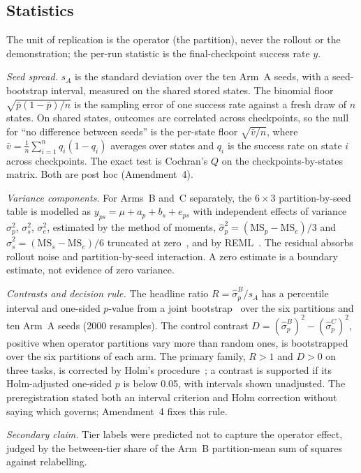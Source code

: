 \IfFileExists{IEEEtran.cls}{\documentclass[journal]{IEEEtran}}{\documentclass[10pt,twocolumn]{article}}
\newcommand{\sdp}{\hat\sigma_p}
\begin{document}
\subsection{Statistics}
\label{sec:stats}
The unit of replication is the operator (the partition), never the rollout or the demonstration; the per-run statistic is the final-checkpoint success rate $y$.

\emph{Seed spread.} $s_A$ is the standard deviation over the ten Arm~A seeds, with a seed-bootstrap interval, measured on the shared stored states. The binomial floor $\sqrt{\bar p(1-\bar p)/n}$ is the sampling error of one success rate against a fresh draw of $n$ states. On shared states, outcomes are correlated across checkpoints, so the null for ``no difference between seeds'' is the per-state floor $\sqrt{\bar v/n}$, where $\bar v=\frac{1}{n}\sum_{i=1}^{n} q_i(1-q_i)$ averages over states and $q_i$ is the success rate on state $i$ across checkpoints. The exact test is Cochran's $Q$ on the checkpoints-by-states matrix. Both are post hoc (Amendment~4).

\emph{Variance components.} For Arms~B and~C separately, the $6\times 3$ partition-by-seed table is modelled as $y_{ps} = \mu + a_p + b_s + e_{ps}$ with independent effects of variance $\sigma_p^2$, $\sigma_s^2$, $\sigma_e^2$, estimated by the method of moments, $\hat\sigma_p^2=(\mathrm{MS}_p-\mathrm{MS}_e)/3$ and $\hat\sigma_s^2=(\mathrm{MS}_s-\mathrm{MS}_e)/6$ truncated at zero~\cite{searle1992variance}, and by REML~\cite{patterson1971reml,seabold2010statsmodels}. The residual absorbs rollout noise and partition-by-seed interaction. A zero estimate is a boundary estimate, not evidence of zero variance.

\emph{Contrasts and decision rule.} The headline ratio $R=\sdp^{B}/s_A$ has a percentile interval and one-sided $p$-value from a joint bootstrap~\cite{efron1993bootstrap} over the six partitions and ten Arm~A seeds (2000 resamples). The control contrast $D=(\sdp^{B})^2-(\sdp^{C})^2$, positive when operator partitions vary more than random ones, is bootstrapped over the six partitions of each arm. The primary family, $R>1$ and $D>0$ on three tasks, is corrected by Holm's procedure~\cite{holm1979}; a contrast is supported if its Holm-adjusted one-sided $p$ is below 0.05, with intervals shown unadjusted. The preregistration stated both an interval criterion and Holm correction without saying which governs; Amendment~4 fixes this rule.

\emph{Secondary claim.} Tier labels were predicted not to capture the operator effect, judged by the between-tier share of the Arm~B partition-mean sum of squares against relabelling.
\end{document}

